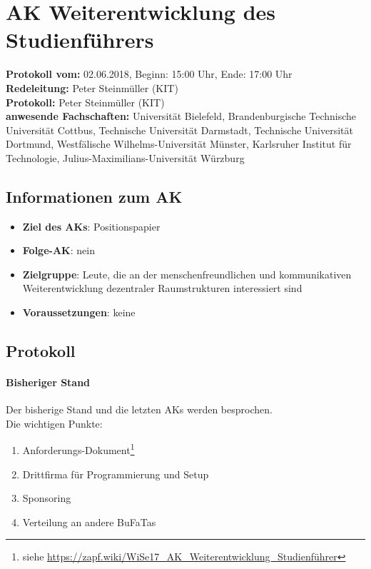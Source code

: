 
\section{AK Weiterentwicklung des Studienführers}

  \textbf{Protokoll vom:} 02.06.2018, %
  Beginn: 15:00 Uhr,
  Ende: 17:00 Uhr \\
  \textbf{Redeleitung:} Peter Steinmüller (KIT) \\
  \textbf{Protokoll:} Peter Steinmüller (KIT) \\
  \textbf{anwesende Fachschaften:} Universität Bielefeld, Brandenburgische Technische Universität Cottbus, Technische Universität Darmstadt, Technische Universität Dortmund, Westfälische Wilhelms-Universität Münster, Karlsruher Institut für Technologie, Julius-Maximilians-Universität Würzburg

  \subsection*{Informationen zum AK}
    \begin{itemize}
      \item \textbf{Ziel des AKs}: Positionspapier
      \item \textbf{Folge-AK}: nein
      \item \textbf{Zielgruppe}: Leute, die an der menschenfreundlichen und kommunikativen Weiterentwicklung dezentraler Raumstrukturen interessiert sind
      \item \textbf{Voraussetzungen}: keine
    \end{itemize}

  \subsection*{Protokoll}
    \paragraph{Bisheriger Stand}
      Der bisherige Stand und die letzten AKs werden besprochen. \\

      Die wichtigen Punkte:
      \begin{enumerate}
        \item Anforderungs-Dokument\footnote{siehe \url{https://zapf.wiki/WiSe17_AK_Weiterentwicklung_Studienführer}}
        \item Drittfirma für Programmierung und Setup
        \item Sponsoring
        \item Verteilung an andere BuFaTas
      \end{enumerate}

